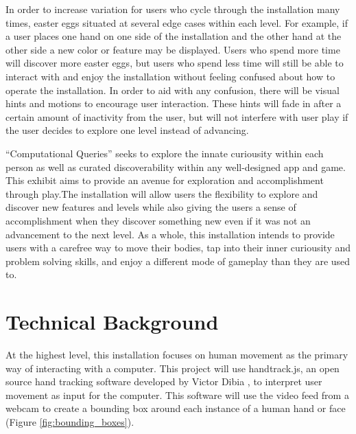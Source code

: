 \documentclass[10pt,twocolumn]{article}
\begin{document}
In order to increase variation for users who cycle through the installation many times, easter eggs situated at several edge cases within each level.  For example, if a user places one hand on one side of the installation and the other hand at the other side a new color or feature may be displayed.  Users who spend more time will discover more easter eggs, but users who spend less time will still be able to interact with and enjoy the installation without feeling confused about how to operate the installation.  In order to aid with any confusion, there will be visual hints and motions to encourage user interaction. These hints will fade in after a certain amount of inactivity from the user, but will not interfere with user play if the user decides to explore one level instead of advancing. 

``Computational Queries'' seeks to explore the innate curiousity within each person as well as curated discoverability within any well-designed app and game. This exhibit aims to provide an avenue for exploration and accomplishment through play.The installation will allow users the flexibility to explore and discover new features and levels while also giving the users a sense of accomplishment when they discover something new even if it was not an advancement to the next level. As a whole, this installation intends to provide users with a carefree way to move their bodies, tap into their inner curiousity and problem solving skills, and enjoy a different mode of gameplay than they are used to. 


\section{Technical Background}
At the highest level, this installation focuses on human movement as the primary way of interacting with a computer.  This project will use handtrack.js, an open source hand tracking software developed by Victor Dibia \cite{noauthor_handtrackjs_nodate-1}, to interpret user movement as input for the computer.  This software will use the video feed from a webcam to create a bounding box around each instance of a human hand or face (Figure \ref{fig:bounding_boxes}).  
\end{document}
